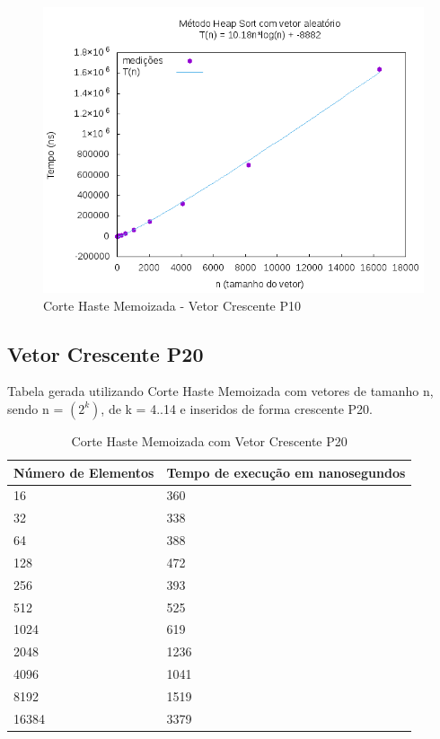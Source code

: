 \documentclass[12pt,a4paper,twoside]{report}
\begin{document}
\begin{figure}[H]
    \centering
    \includegraphics[width=0.7\linewidth]{graficos/HeapSort/vIntAleatorio/vIntAleatorio.png}
  \caption{Corte Haste Memoizada - Vetor Crescente P10}
\end{figure}

\subsection{Vetor Crescente P20}
Tabela gerada utilizando Corte Haste Memoizada com vetores de tamanho n, sendo n = $(2^k)$, de k = 4..14 e inseridos de forma crescente P20.
\begin{table}[H]
\centering
\caption{Corte Haste Memoizada com Vetor Crescente P20}
\label{my-label}
\begin{tabular}{|l|l|}
\hline
\multicolumn{1}{|c|}{\textbf{Número de Elementos}} & \multicolumn{1}{c|}{\textbf{Tempo de execução em nanosegundos}} \\ \hline
16 & 360 \\ \hline
32 & 338 \\ \hline
64 & 388 \\ \hline
128 & 472 \\ \hline
256 & 393 \\ \hline
512 & 525 \\ \hline
1024 & 619 \\ \hline
2048 & 1236 \\ \hline
4096 & 1041 \\ \hline
8192 & 1519 \\ \hline
16384 & 3379 \\ \hline

\end{tabular}
\end{table}
\end{document}
